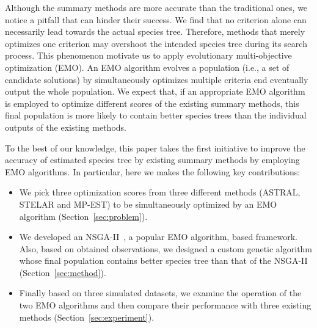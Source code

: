 Although the summary methods are more accurate than the traditional ones, we notice a pitfall that can hinder their success. We find that no criterion alone can necessarily lead towards the actual species tree. Therefore, methods that merely optimizes one criterion may overshoot the intended species tree during its search process. This phenomenon motivate us to apply evolutionary multi-objective optimization (EMO). An EMO algorithm evolves a population (i.e., a set of candidate solutions) by simultaneously optimizes multiple criteria end eventually output the whole population. We expect that, if an appropriate EMO algorithm is employed to optimize different scores of the existing summary methods, this final population is more likely to contain better species trees than the individual outputs of the existing methods. 

To the best of our knowledge, this paper takes the first initiative to improve the accuracy of estimated species tree by existing summary methods by employing EMO algorithms.  In particular, here we makes the following key
contributions:

\begin{itemize}
	\item We pick three optimization scores from three different methods (ASTRAL, STELAR and MP-EST) to be simultaneously optimized by an EMO algorithm (Section~\ref{sec:problem}).  
	\item We developed an NSGA-II~\cite{deb2002fast}, a popular EMO algorithm, based  framework. Also, based on obtained observations, we designed a custom genetic algorithm whose final population contains better species tree than that of the NSGA-II (Section~\ref{sec:method}). 
	\item Finally based on three simulated datasets, we examine the operation of the two EMO algorithms and then compare their performance with three existing methods (Section~\ref{sec:experiment}). 
\end{itemize}


